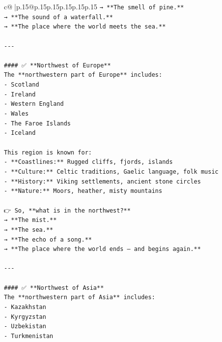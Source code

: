 \documentclass{article}
\begin{document}
{\begin{supertabular}{c@{$\;$}|p{.15\linewidth}@{}p{.15\linewidth}p{.15\linewidth}p{.15\linewidth}p{.15\linewidth}p{.15\linewidth}}
{{{\texttt{→ **The smell of pine.**  } \\
\texttt{→ **The sound of a waterfall.**  } \\
\texttt{→ **The place where the world meets the sea.**} \\
\\ 
\texttt{{-}{-}{-}} \\
\\ 
\texttt{\#\#\#\# ✅ **Northwest of Europe**  } \\
\texttt{The **northwestern part of Europe** includes:} \\
\texttt{{-} Scotland} \\
\texttt{{-} Ireland} \\
\texttt{{-} Western England} \\
\texttt{{-} Wales} \\
\texttt{{-} The Faroe Islands} \\
\texttt{{-} Iceland} \\
\\ 
\texttt{This region is known for:} \\
\texttt{{-} **Coastlines:** Rugged cliffs, fjords, islands} \\
\texttt{{-} **Culture:** Celtic traditions, Gaelic language, folk music} \\
\texttt{{-} **History:** Viking settlements, ancient stone circles} \\
\texttt{{-} **Nature:** Moors, heather, misty mountains} \\
\\ 
\texttt{👉 So, **what is in the northwest?**  } \\
\texttt{→ **The mist.**  } \\
\texttt{→ **The sea.**  } \\
\texttt{→ **The echo of a song.**  } \\
\texttt{→ **The place where the world ends — and begins again.**} \\
\\ 
\texttt{{-}{-}{-}} \\
\\ 
\texttt{\#\#\#\# ✅ **Northwest of Asia**  } \\
\texttt{The **northwestern part of Asia** includes:} \\
\texttt{{-} Kazakhstan} \\
\texttt{{-} Kyrgyzstan} \\
\texttt{{-} Uzbekistan} \\
\texttt{{-} Turkmenistan} \\
}}}
\end{supertabular}}
\end{document}
